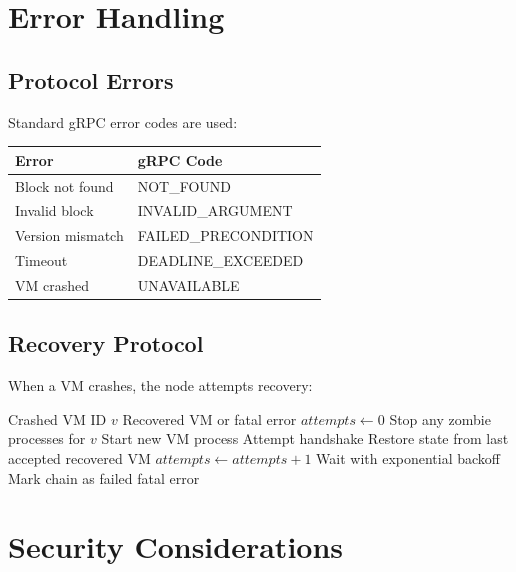 \documentclass[11pt,letterpaper]{article}
\begin{document}
\section{Error Handling}

\subsection{Protocol Errors}

Standard gRPC error codes are used:

\begin{center}
\begin{tabular}{ll}
\toprule
\textbf{Error} & \textbf{gRPC Code} \\
\midrule
Block not found & NOT\_FOUND \\
Invalid block & INVALID\_ARGUMENT \\
Version mismatch & FAILED\_PRECONDITION \\
Timeout & DEADLINE\_EXCEEDED \\
VM crashed & UNAVAILABLE \\
\bottomrule
\end{tabular}
\end{center}

\subsection{Recovery Protocol}

When a VM crashes, the node attempts recovery:

\begin{algorithm}
\caption{VM Crash Recovery}
\label{alg:recovery}
\begin{algorithmic}[1]
\Require Crashed VM ID $v$
\Ensure Recovered VM or fatal error
\State $attempts \gets 0$
    \State Stop any zombie processes for $v$
    \State Start new VM process
    \State Attempt handshake
        \State Restore state from last accepted
        \State \Return recovered VM
    \EndIf
    \State $attempts \gets attempts + 1$
    \State Wait with exponential backoff
\EndWhile
\State Mark chain as failed
\State \Return fatal error
\end{algorithmic}
\end{algorithm}

\section{Security Considerations}
\end{document}
